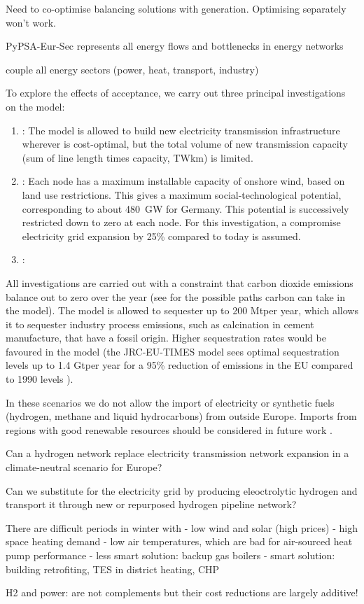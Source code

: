 Need to co-optimise balancing solutions with generation. Optimising separately won't work.

PyPSA-Eur-Sec represents all energy flows and bottlenecks in energy networks

couple all energy sectors (power, heat, transport, industry)

To explore the effects of acceptance, we carry out three principal investigations
on the model:

\begin{enumerate}
\item {}: The model is allowed to build new electricity
transmission infrastructure wherever is cost-optimal, but the total volume of new
transmission capacity (sum of line length times capacity, TWkm) is limited.

\item {}: Each node has a maximum installable capacity of onshore
wind, based on land use restrictions. This gives a maximum social-technological
potential, corresponding to about \SI{480}{\giga\watt} for Germany. This potential is
successively restricted down to zero at each node. For this investigation, a
compromise electricity grid expansion by 25\% compared to today is assumed.

\item {}:
\end{enumerate}

All investigations are carried out with a constraint that carbon dioxide
emissions balance out to zero over the year (see for
the possible paths carbon can take in the model). The model is allowed to
sequester up to 200 Mt\co per year, which allows it to sequester industry
process emissions, such as calcination in cement manufacture, that have a fossil
origin. Higher sequestration rates would be favoured in the model (the
JRC-EU-TIMES model sees optimal sequestration levels up to 1.4 Gt\co per year
for a 95\% reduction of \co emissions in the EU compared to 1990 levels
\cite{blancoPotentialHydrogen2018}).

In these scenarios we do not allow the import of electricity or synthetic fuels
(hydrogen, methane and liquid hydrocarbons) from outside Europe. Imports from
regions with good renewable resources should be considered in future work
\cite{fasihiTechnoeconomicAssessment2019,heuserTechnoeconomicAnalysis2019}.

Can a hydrogen network replace electricity transmission network expansion in a climate-neutral scenario for Europe?

Can we substitute for the electricity grid by producing eleoctrolytic hydrogen
and transport it through new or repurposed hydrogen pipeline network?

There are difficult periods in winter with
- low wind and solar (high prices)
- high space heating demand
- low air temperatures, which are bad for air-sourced heat pump performance
- less smart solution: backup gas boilers
- smart solution: building retrofiting, TES in district heating, CHP

H2 and power: are not complements but their cost reductions are largely additive!



